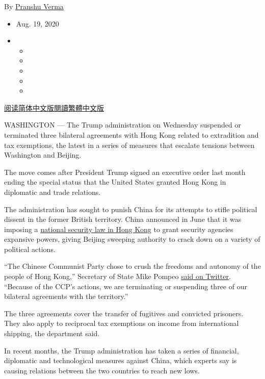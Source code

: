 By \href{https://www.nytimes3xbfgragh.onion/by/pranshu-verma}{Pranshu
Verma}

\begin{itemize}
\item
  Aug. 19, 2020
\item
  \begin{itemize}
  \item
  \item
  \item
  \item
  \item
  \end{itemize}
\end{itemize}

\href{https://cn.nytimes3xbfgragh.onion/usa/20200820/trump-china-hong-kong/}{阅读简体中文版}\href{https://cn.nytimes3xbfgragh.onion/usa/20200820/trump-china-hong-kong/zh-hant/}{閱讀繁體中文版}

WASHINGTON --- The Trump administration on Wednesday suspended or
terminated three bilateral agreements with Hong Kong related to
extradition and tax exemptions, the latest in a series of measures that
escalate tensions between Washington and Beijing.

The move comes after President Trump signed an executive order last
month ending the special status that the United States granted Hong Kong
in diplomatic and trade relations.

The administration has sought to punish China for its attempts to stifle
political dissent in the former British territory. China announced in
June that it was imposing a
\href{https://www.nytimes3xbfgragh.onion/2020/06/30/world/asia/hong-kong-security-law-explain.html}{national
security law in Hong Kong} to grant security agencies expansive powers,
giving Beijing sweeping authority to crack down on a variety of
political actions.

``The Chinese Communist Party chose to crush the freedoms and autonomy
of the people of Hong Kong,'' Secretary of State Mike Pompeo
\href{https://twitter.com/SecPompeo/status/1296126420922634244}{said on
Twitter}. ``Because of the CCP's actions, we are terminating or
suspending three of our bilateral agreements with the territory.''

The three agreements cover the transfer of fugitives and convicted
prisoners. They also apply to reciprocal tax exemptions on income from
international shipping, the department said.

In recent months, the Trump administration has taken a series of
financial, diplomatic and technological measures against China, which
experts say is causing relations between the two countries to reach new
lows.

